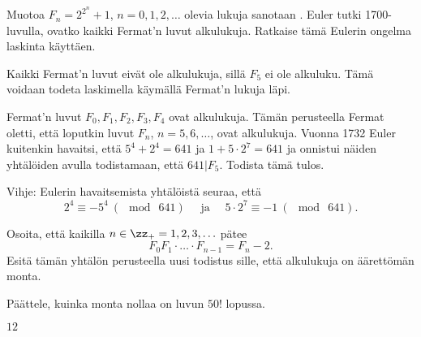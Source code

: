 \begin{tehtavasivu}
\begin{tehtava}
    Muotoa $F_n = 2^{2^n}+1$, $n=0, 1, 2, \ldots$ olevia lukuja sanotaan . Euler tutki 1700-luvulla, ovatko kaikki Fermat'n luvut alkulukuja. Ratkaise tämä Eulerin ongelma laskinta käyttäen.
    
    \begin{vastaus}
        Kaikki Fermat'n luvut eivät ole alkulukuja, sillä $F_5$ ei ole alkuluku. Tämä voidaan todeta laskimella käymällä Fermat'n lukuja läpi.
    \end{vastaus}
\end{tehtava}

\begin{tehtava}
    Fermat'n luvut $F_0, F_1, F_2, F_3, F_4$ ovat alkulukuja. Tämän perusteella Fermat oletti, että loputkin luvut $F_n$, $n=5, 6, \ldots$, ovat alkulukuja. Vuonna 1732 Euler kuitenkin havaitsi, että $5^4 + 2^4 = 641$
ja $1 + 5\cdot 2^7 = 641$ ja onnistui näiden yhtälöiden avulla todistamaan, että $641 | F_5$. Todista tämä tulos.

Vihje: Eulerin havaitsemista yhtälöistä seuraa, että
\[
2^4 \equiv -5^4\ (\mod\ 641)\quad\text{ ja }\quad5\cdot 2^7 \equiv -1\ (\mod\ 641).
\]
\end{tehtava}

\begin{tehtava}
    Osoita, että kaikilla $n\in\zz_{+}=1, 2, 3, \ldots$ pätee
\[
F_{0}F_{1}\cdot \ldots \cdot F_{n-1} = F_{n} - 2.
\]
Esitä tämän yhtälön perusteella uusi todistus sille,
että alkulukuja on äärettömän monta.
\end{tehtava}

\begin{tehtava}
    Päättele, kuinka monta nollaa on luvun $50!$ lopussa.

    \begin{vastaus}
        $12$
    \end{vastaus}
    
\end{tehtava}

\end{tehtavasivu}



